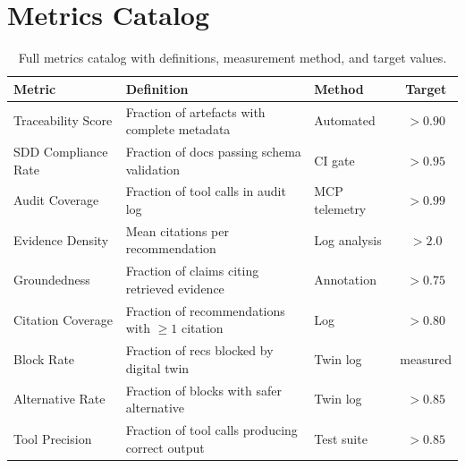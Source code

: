 \section{Metrics Catalog}
\label{app:metrics-catalog}

\begin{table}[ht]
\centering
\caption{Full metrics catalog with definitions, measurement method, and target values.}
\label{tab:metrics-catalog}
\begin{tabular}{lp{5cm}lc}
\toprule
Metric & Definition & Method & Target \\
\midrule
Traceability Score & Fraction of artefacts with complete metadata & Automated & $> 0.90$ \\
SDD Compliance Rate & Fraction of docs passing schema validation & CI gate & $> 0.95$ \\
Audit Coverage & Fraction of tool calls in audit log & MCP telemetry & $> 0.99$ \\
Evidence Density & Mean citations per recommendation & Log analysis & $> 2.0$ \\
Groundedness & Fraction of claims citing retrieved evidence & Annotation & $> 0.75$ \\
Citation Coverage & Fraction of recommendations with $\geq 1$ citation & Log & $> 0.80$ \\
Block Rate & Fraction of recs blocked by digital twin & Twin log & measured \\
Alternative Rate & Fraction of blocks with safer alternative & Twin log & $> 0.85$ \\
Tool Precision & Fraction of tool calls producing correct output & Test suite & $> 0.85$ \\
\bottomrule
\end{tabular}
\end{table}
